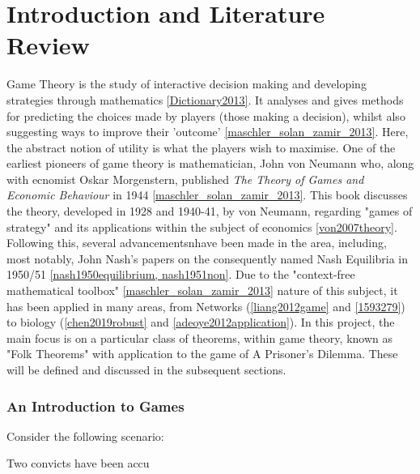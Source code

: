 \chapter{Introduction and Literature Review}

Game Theory is the study of interactive decision making and developing
strategies through mathematics \ref{Dictionary2013}. It analyses and gives
methods for predicting the choices made by players (those making a decision),
whilst also suggesting ways to improve their 'outcome'
\ref{maschler_solan_zamir_2013}. Here, the abstract notion of utility is what
the players wish to maximise. One of the earliest
pioneers of game theory is mathematician, John von Neumann who, along with
ecnomist Oskar Morgenstern, published \textit{The Theory of Games and Economic
Behaviour} in 1944 \ref{maschler_solan_zamir_2013}. This book discusses the
theory, developed in 1928 and 1940-41, by von Neumann, regarding "games of
strategy" and its applications within the subject of economics
\ref{von2007theory}. Following this, several advancementsnhave been made in the
area, including, most notably, John Nash's papers on the consequently named Nash
Equilibria in 1950/51 \ref{nash1950equilibrium, nash1951non}. Due to the
"context-free mathematical toolbox" \ref{maschler_solan_zamir_2013} nature of
this subject, it has been applied in many areas, from Networks
(\ref{liang2012game} and \ref{1593279}) to biology (\ref{chen2019robust} and
\ref{adeoye2012application}). In this project, the main focus is on a particular
class of theorems, within game theory, known as "Folk Theorems" with application
to the game of A Prisoner's Dilemma. These will be defined and discussed in the
subsequent sections.

\subsection{An Introduction to Games}
Consider the following scenario:
\begin{center}
    Two convicts have been accu
\end{center}